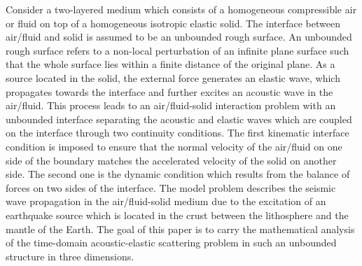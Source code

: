 \documentclass[final,leqno]{siamltex}
\begin{document}
Consider a two-layered medium which consists of a homogeneous compressible air
or fluid on top of a homogeneous isotropic elastic solid. The interface between
air/fluid and solid is assumed to be an unbounded rough surface. An unbounded
rough surface refers to a non-local perturbation of an infinite plane surface
such that the whole surface lies within a finite distance of the original plane.
As a source located in the solid, the external force generates an elastic
wave, which propagates towards the interface and further excites an acoustic
wave in the air/fluid. This process leads to an air/fluid-solid interaction
problem with an unbounded interface separating the acoustic and elastic waves
which are coupled on the interface through two continuity conditions. The
first kinematic interface condition is imposed to ensure that the normal
velocity of the air/fluid on one side of the boundary matches the accelerated
velocity of the solid on another side. The second one is the dynamic condition
which results from the balance of forces on two sides of the interface. The
model problem describes the seismic wave propagation in the air/fluid-solid
medium due to the excitation of an earthquake source which is located in the
crust between the lithosphere and the mantle of the Earth. The goal of this
paper is to carry the mathematical analysis of the time-domain acoustic-elastic
scattering problem in such an unbounded structure in three dimensions.
\end{document}
